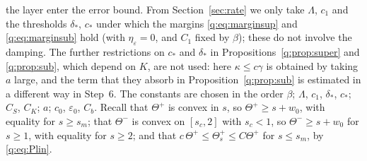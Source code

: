\documentclass[11pt]{amsart}
\theoremstyle{definition}
\theoremstyle{remark}
\newcommand{\ve}{\varepsilon}
\begin{document}
the layer enter the error bound. From Section~\ref{sec:rate} we only take $\Lambda$, $c_1$
and the thresholds $\delta_*$, $c_*$ under which the margins \eqref{q:eq:marginsup} and
\eqref{q:eq:marginsub} hold (with $\eta_\ve=0$, and $C_1$ fixed by $\beta$); these do not involve
the damping.
The further restrictions on $c_*$ and $\delta_*$ in Propositions~\ref{q:prop:super} and
\ref{q:prop:sub}, which depend on $K$, are not used: here $\kappa\le c\gamma$ is obtained by
taking $a$ large, and the term that they absorb in Proposition~\ref{q:prop:sub} is
estimated in a different way in Step~6. The constants are chosen in the order $\beta$;
$\Lambda$, $c_1$, $\delta_*$, $c_*$; $C_S$, $C_K$; $a$;
$c_0$, $\ve_0$, $C_b$. Recall that $\Theta^+$ is convex in $s$, so $\Theta^+\ge s+w_0$, with equality for
$s\ge s_m$; that $\Theta^-$ is convex on $[s_c,2]$ with $s_c<1$, so $\Theta^-\ge s+w_0$ for $s\ge1$, with
equality for $s\ge2$; and that $c\,\Theta^+\le\Theta^+_s\le C\Theta^+$ for $s\le s_m$, by \eqref{q:eq:Plin}.
\end{document}
